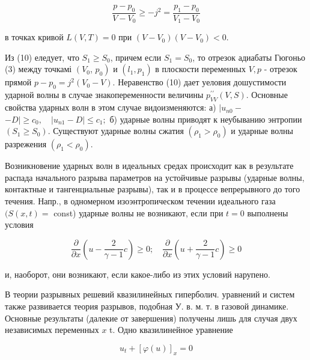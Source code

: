 \documentclass[10pt]{article}
\begin{document}
\[

\frac{p-p_{0}}{V-V_{0}} \geqslant-j^{2}=\frac{p_{1}-p_{0}}{V_{1}-V_{0}}

\]



в точках кривой $L(V, T)=0$ при $\left(V-V_{0}\right)\left(V-V_{0}\right)<0$.



Из (10) еледует, что $S_{1} \geqslant S_{0}$, причем если $S_{1}=S_{0}$, то отрезок адиабаты Гюгоньо (3) между точкамі $\left(V_{0}\right.$, $\left.p_{0}\right)$ и $\left(l_{1}, p_{1}\right)$ в плоскости переменных $V, p$ - отрезок прямой $p-p_{0}=j^{2}\left(V_{0}-V\right)$. Неравенство (10) дает уеловия дошустимости ударной волны в случае знакопеременности величины $p_{V V}^{\prime \prime}(V, S)$. Основные свойства ударных волн в этом случае видоизменяются: а) $\mid u_{n 0}-$ $-D\left|\geqslant c_{0}, \quad\right| u_{n 1}-D \mid \leqslant c_{1} ;$ б) ударные волны приводят к неубыванию энтропии $\left(S_{1} \geqslant S_{0}\right)$. Существуют ударные волны сжатия $\left(\rho_{1}>\rho_{0}\right)$ и ударные волны разрежения $\left(\rho_{1}<\rho_{0}\right)$.



Возникновение ударных волн в идеальных средах происходит как в результате распада начального разрыва параметров на устойчивые разрывы (ударные волны, контактные и тангенциальные разрывы), так и в процессе вепрерывного до того течения. Напр., в одномерном изоэнтропическом течении идеального газа $(S(x, t)=$ const) ударные волны не возникают, если при $t=0$ выполнены условия



\[

\frac{\partial}{\partial x}\left(u-\frac{2}{\gamma-1} c\right) \geqslant 0 ; \quad \frac{\partial}{\partial x}\left(u+\frac{2}{\gamma-1} c\right) \geqslant 0

\]



и, наоборот, они возникают, если какое-либо из этих условий нарупено.



В теории разрывных решевий квазилинейных гиперболич. уравнений и систем также развивается теория разрывов, подобная У. в. м. т. в газовой динамике. Основные результаты (далекие от завершения) получены лишь для случая двух независимых переменных $x$ t. Одно квазилинейное уравнение



\[

u_{t}+[\varphi(u)]_{x}=0

\]
\end{document}
